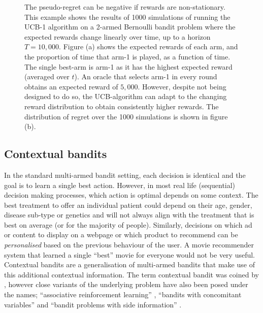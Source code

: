 \documentclass[11pt,a4paper,oneside]{book}
\newcommand{\quotes}[1]{``#1''}
\theoremstyle{plain}
\theoremstyle{definition}
\begin{document}
\begin{figure}[h]
\begin{subfigure}[t]{0.49\textwidth}
    \end{subfigure}
      \caption{The pseudo-regret can be negative if rewards are non-stationary. This example shows the results of 1000 simulations of running the UCB-1 algorithm on a 2-armed Bernoulli bandit problem where the expected rewards change linearly over time, up to a horizon $T=10,000$. Figure (a) shows the expected rewards of each arm, and the proportion of time that arm-1 is played, as a function of time. The single best-arm is arm-1 as it has the highest expected reward (averaged over $t$). An oracle that selects arm-1 in every round obtains an expected reward of $5,000$. However, despite not being designed to do so, the UCB-algorithm can adapt to the changing reward distribution to obtain consistently higher rewards. The distribution of regret over the 1000 simulations is shown in figure (b).}\label{fig:non-stationary-bandit}
\end{figure}

\subsection{Contextual bandits}
\label{sec:contextual-bandits}

In the standard multi-armed bandit setting, each decision is identical and the goal is to learn a single best action. However, in most real life (sequential) decision making processes, which action is optimal depends on some context.  The best treatment to offer an individual patient could depend on their age, gender, disease sub-type or genetics and will not always align with the treatment that is best on average (or for the majority of people).  Similarly, decisions on which ad or content to display on a webpage or which product to recommend can be \emph{personalised} based on the previous behaviour of the user. A movie recommender system that learned a single \quotes{best} movie for everyone would not be very useful. Contextual bandits are a generalisation of multi-armed bandits that make use of this additional contextual information. The term contextual bandit was coined by \citet{Langford2008}, however close variants of the underlying problem have also been posed under the names; \quotes{associative reinforcement learning} \citep{kaelbling1994associative}, \quotes{bandits with concomitant variables}\citep{woodroofe1979one} and  \quotes{bandit problems with side information} \citep{wang2005bandit}. 
\end{document}
